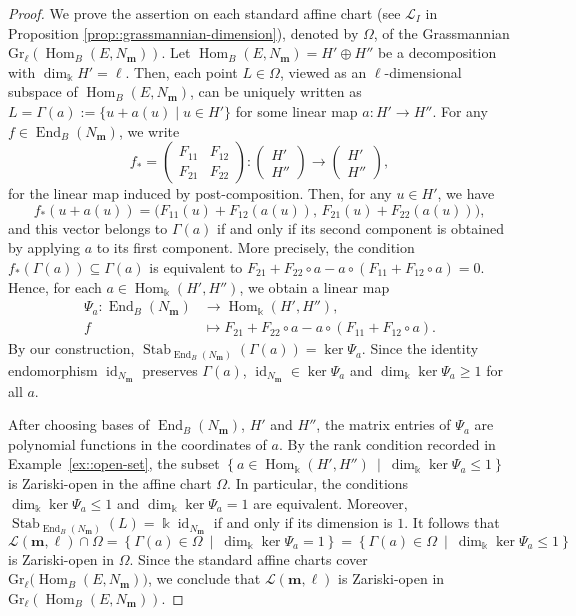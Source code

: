 \documentclass[a4,12pt]{amsart}
\numberwithin{equation}{section} %
\def\Hom{\operatorname{Hom}} %
\def\End{\operatorname{End}} %
\def\Stab{\operatorname{Stab}} %
\def\Gr{\mathrm{Gr}} %
\theoremstyle{definition} %
\begin{document}
\begin{proof} 
We prove the assertion on each standard affine chart (see $\mathcal{L}_I$ in Proposition \ref{prop::grassmannian-dimension}), denoted by $\Omega$, of the Grassmannian $\Gr_\ell(\Hom_B(E,N_{\mathbf{m}}))$. Let $\Hom_B(E,N_{\mathbf{m}})=H'\oplus H''$ be a decomposition with $\dim_{\Bbbk} H'=\ell$. Then, each point $L\in\Omega$, viewed as an $\ell$-dimensional subspace of
$\Hom_B(E,N_{\mathbf{m}})$, can be uniquely written as $L=\Gamma(a):=\{u+a(u)\mid u\in H'\}$ for some linear map $a\colon H'\to H''$. For any $f\in\End_B(N_{\mathbf{m}})$, we write
\[ 
f_*= \begin{pmatrix} F_{11}&F_{12}\\ F_{21}&F_{22} \end{pmatrix}\colon  
\begin{pmatrix} H'\\ H'' \end{pmatrix}\longrightarrow 
\begin{pmatrix} H'\\ H'' \end{pmatrix},
\]
for the linear map induced by post-composition. Then, for any $u\in H'$, we have 
\[
f_*(u+a(u)) = \bigl(F_{11}(u)+F_{12}(a(u)),\, F_{21}(u)+F_{22}(a(u))\bigr), 
\]
and this vector belongs to $\Gamma(a)$ if and only if its second component is obtained by applying $a$ to its first component. More precisely, the condition $f_*(\Gamma(a))\subseteq \Gamma(a)$ is equivalent to $F_{21}+F_{22}\circ a-a\circ (F_{11}+F_{12}\circ a)=0$. Hence, for each $a\in\Hom_{\Bbbk}(H',H'')$, we obtain a linear map 
\[
\begin{aligned}
\Psi_a\colon \End_B(N_{\mathbf{m}}) &\longrightarrow \Hom_{\Bbbk}(H',H''),\\
f &\longmapsto F_{21}+F_{22}\circ a-a\circ (F_{11}+F_{12}\circ a).
\end{aligned}
\]
By our construction, $\Stab_{\End_B(N_{\mathbf{m}})}(\Gamma(a))=\ker\Psi_a$. Since the identity endomorphism $\operatorname{id}_{N_{\mathbf{m}}}$ preserves $\Gamma(a)$, $\operatorname{id}_{N_{\mathbf{m}}}\in\ker\Psi_a$ and $\dim_{\Bbbk}\ker\Psi_a\geq1$ for all $a$.
 
After choosing bases of $\End_B(N_{\mathbf{m}})$, $H'$ and $H''$, the matrix entries of $\Psi_a$ are polynomial functions in the coordinates of $a$. By the rank condition recorded in Example~\ref{ex::open-set}, the subset $\left\{ a\in \Hom_{\Bbbk}(H',H'') \ \middle|\ \dim_{\Bbbk}\ker\Psi_a\leq 1 \right\} $ is Zariski-open in the affine chart $\Omega$. In particular, the conditions $\dim_{\Bbbk}\ker\Psi_a\leq1$ and $\dim_{\Bbbk}\ker\Psi_a=1$ are equivalent. Moreover, $\Stab_{\End_B(N_{\mathbf{m}})}(L)=\Bbbk\operatorname{id}_{N_{\mathbf{m}}}$ if and only if its dimension is $1$. It follows that 
\[
\mathcal{L}(\mathbf{m},\ell)\cap\Omega
=
\left\{
\Gamma(a)\in\Omega
\ \middle|\
\dim_{\Bbbk}\ker\Psi_a=1
\right\}
=
\left\{
\Gamma(a)\in\Omega
\ \middle|\
\dim_{\Bbbk}\ker\Psi_a\leq1
\right\}
\]
is Zariski-open in $\Omega$. Since the standard affine charts cover $\Gr_\ell\bigl(\Hom_B(E,N_{\mathbf{m}})\bigr)$, we conclude that $\mathcal{L}(\mathbf{m},\ell)$ is Zariski-open in $\Gr_\ell(\Hom_B(E,N_{\mathbf{m}}))$. 
\end{proof}
\end{document}
